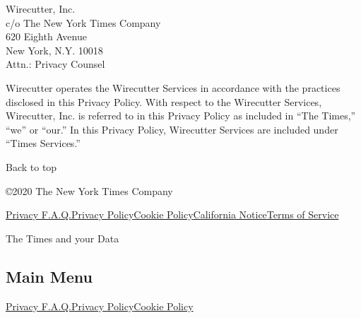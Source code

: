 Wirecutter, Inc.\\
c/o The New York Times Company\\
620 Eighth Avenue\\
New York, N.Y. 10018\\
Attn.: Privacy Counsel

Wirecutter operates the Wirecutter Services in accordance with the
practices disclosed in this Privacy Policy. With respect to the
Wirecutter Services, Wirecutter, Inc. is referred to in this Privacy
Policy as included in ``The Times,'' ``we'' or ``our.'' In this Privacy
Policy, Wirecutter Services are included under ``Times Services.''

Back to top

©2020 The New York Times Company

\href{/privacy}{Privacy F.A.Q.}\href{/privacy/privacy-policy}{Privacy
Policy}\href{/privacy/cookie-policy}{Cookie
Policy}\href{/privacy/california-notice}{California
Notice}\href{https://help.nytimes.com/hc/en-us/articles/115014893428-Terms-of-service}{Terms
of Service}

The Times and your Data

\hypertarget{main-menu}{%
\subsection{Main Menu}\label{main-menu}}

\href{/privacy}{Privacy F.A.Q.}\href{/privacy/privacy-policy}{Privacy
Policy}\href{/privacy/cookie-policy}{Cookie Policy}
